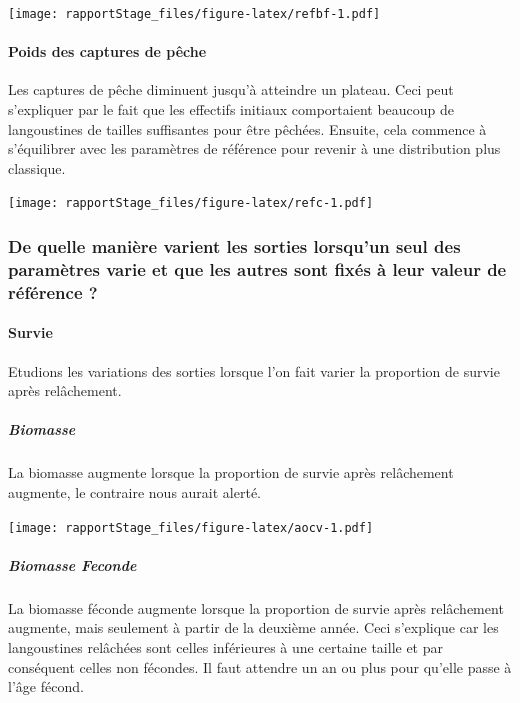 \documentclass[
]{article}
\begin{document}
\texttt{[image: rapportStage\_files/figure-latex/refbf-1.pdf]}

\hypertarget{poids-des-captures-de-puxeache}{%
\paragraph{Poids des captures de
pêche}\label{poids-des-captures-de-puxeache}}

Les captures de pêche diminuent jusqu'à atteindre un plateau. Ceci peut
s'expliquer par le fait que les effectifs initiaux comportaient beaucoup
de langoustines de tailles suffisantes pour être pêchées. Ensuite, cela
commence à s'équilibrer avec les paramètres de référence pour revenir à
une distribution plus classique.

\texttt{[image: rapportStage\_files/figure-latex/refc-1.pdf]}

\hypertarget{de-quelle-maniuxe8re-varient-les-sorties-lorsquun-seul-des-paramuxe8tres-varie-et-que-les-autres-sont-fixuxe9s-uxe0-leur-valeur-de-ruxe9fuxe9rence}{%
\subsubsection{De quelle manière varient les sorties lorsqu'un seul des
paramètres varie et que les autres sont fixés à leur valeur de référence
?}\label{de-quelle-maniuxe8re-varient-les-sorties-lorsquun-seul-des-paramuxe8tres-varie-et-que-les-autres-sont-fixuxe9s-uxe0-leur-valeur-de-ruxe9fuxe9rence}}

\hypertarget{survie}{%
\paragraph{Survie}\label{survie}}

Etudions les variations des sorties lorsque l'on fait varier la
proportion de survie après relâchement.

\hypertarget{biomasse-1}{%
\subparagraph{Biomasse}\label{biomasse-1}}

La biomasse augmente lorsque la proportion de survie après relâchement
augmente, le contraire nous aurait alerté.

\texttt{[image: rapportStage\_files/figure-latex/aocv-1.pdf]}

\hypertarget{biomasse-feconde}{%
\subparagraph{Biomasse Feconde}\label{biomasse-feconde}}

La biomasse féconde augmente lorsque la proportion de survie après
relâchement augmente, mais seulement à partir de la deuxième année. Ceci
s'explique car les langoustines relâchées sont celles inférieures à une
certaine taille et par conséquent celles non fécondes. Il faut attendre
un an ou plus pour qu'elle passe à l'âge fécond.
\end{document}
